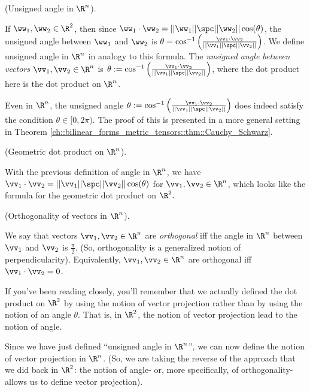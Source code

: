 \begin{defn}
\label{ch::lin_alg::defn::angle_in_Rn}
    (Unsigned angle in $\R^n$). 
    
    If $\ww_1, \ww_2 \in \R^2$, then since $\ww_1 \cdot \ww_2 = ||\ww_1|| \spc ||\ww_2||\cos(\theta)$, the unsigned angle between $\ww_1$ and $\ww_2$ is $\theta = \cos^{-1}\Big(\frac{\vv_1 \cdot \vv_2}{||\vv_1|| \spc ||\vv_2||}\Big)$. We define unsigned angle in $\R^n$ in analogy to this formula. The \textit{unsigned angle between vectors $\vv_1, \vv_2 \in \R^n$} is ${\theta := \cos^{-1}\Big(\frac{\vv_1 \cdot \vv_2}{||\vv_1|| \spc ||\vv_2||}\Big)}$, where the dot product here is the dot product on $\R^n$.
    
    Even in $\R^n$, the unsigned angle $\theta := \cos^{-1}\Big(\frac{\vv_1 \cdot \vv_2}{||\vv_1|| \spc ||\vv_2||}\Big)$ does indeed satisfy the condition $\theta \in [0, 2\pi)$. The proof of this is presented in a more general setting in Theorem \ref{ch::bilinear_forms_metric_tensors::thm::Cauchy_Schwarz}.
\end{defn}

\begin{remark}
\label{ch::lin_alg::rmk::geometric_dot_prod_Rn}
    (Geometric dot product on $\R^n$).
    
    With the previous definition of angle in $\R^n$, we have $\vv_1 \cdot \vv_2 = ||\vv_1|| \spc ||\vv_2||\cos(\theta)$ for $\vv_1, \vv_2 \in \R^n$, which looks like the formula for the geometric dot product on $\R^2.$
\end{remark}

\begin{defn}
\label{ch::lin_alg::defn::orthogonality_in_Rn}
    (Orthogonality of vectors in $\R^n$). 
    
    We say that vectors $\vv_1, \vv_2 \in \R^n$ are \textit{orthogonal} iff the angle in $\R^n$ between $\vv_1$ and $\vv_2$ is $\frac{\pi}{2}$. (So, orthogonality is a generalized notion of perpendicularity). Equivalently, $\vv_1, \vv_2 \in \R^n$ are orthogonal iff $\vv_1 \cdot \vv_2 = 0$.
\end{defn}

If you've been reading closely, you'll remember that we actually defined the dot product on $\R^2$ by using the notion of vector projection rather than by using the notion of an angle $\theta$. That is, in $\R^2$, the notion of vector projection lead to the notion of angle.
    
Since we have just defined ``unsigned angle in $\R^n$'', we can now define the notion of vector projection in $\R^n$. (So, we are taking the reverse of the approach that we did back in $\R^2$: the notion of angle- or, more specifically, of orthogonality- allows us to define vector projection).

